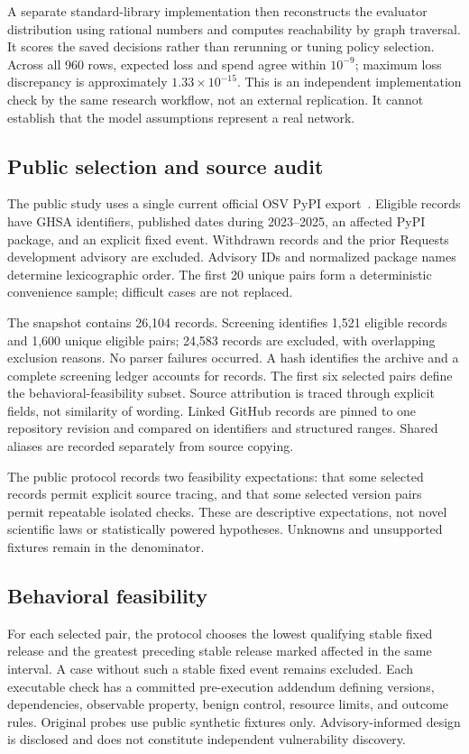 \documentclass[manuscript,screen,nonacm]{acmart}
\begin{document}
A separate standard-library implementation then reconstructs the evaluator distribution using rational numbers and computes reachability by graph traversal. It scores the saved decisions rather than rerunning or tuning policy selection. Across all 960 rows, expected loss and spend agree within $10^{-9}$; maximum loss discrepancy is approximately $1.33\times10^{-15}$. This is an independent implementation check by the same research workflow, not an external replication. It cannot establish that the model assumptions represent a real network.

\subsection{Public selection and source audit}
The public study uses a single current official OSV PyPI export~\cite{osv}. Eligible records have GHSA identifiers, published dates during 2023--2025, an affected PyPI package, and an explicit fixed event. Withdrawn records and the prior Requests development advisory are excluded. Advisory IDs and normalized package names determine lexicographic order. The first 20 unique pairs form a deterministic convenience sample; difficult cases are not replaced.

The snapshot contains 26,104 records. Screening identifies 1,521 eligible records and 1,600 unique eligible pairs; 24,583 records are excluded, with overlapping exclusion reasons. No parser failures occurred. A hash identifies the archive and a complete screening ledger accounts for records. The first six selected pairs define the behavioral-feasibility subset. Source attribution is traced through explicit fields, not similarity of wording. Linked GitHub records are pinned to one repository revision and compared on identifiers and structured ranges. Shared aliases are recorded separately from source copying.

The public protocol records two feasibility expectations: that some selected records permit explicit source tracing, and that some selected version pairs permit repeatable isolated checks. These are descriptive expectations, not novel scientific laws or statistically powered hypotheses. Unknowns and unsupported fixtures remain in the denominator.

\subsection{Behavioral feasibility}
For each selected pair, the protocol chooses the lowest qualifying stable fixed release and the greatest preceding stable release marked affected in the same interval. A case without such a stable fixed event remains excluded. Each executable check has a committed pre-execution addendum defining versions, dependencies, observable property, benign control, resource limits, and outcome rules. Original probes use public synthetic fixtures only. Advisory-informed design is disclosed and does not constitute independent vulnerability discovery.
\end{document}
